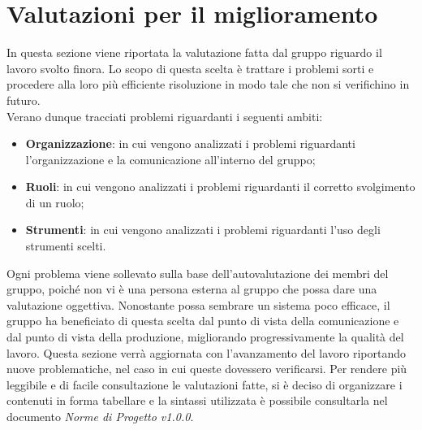 \section{Valutazioni per il miglioramento}
In questa sezione viene riportata la valutazione fatta dal gruppo riguardo il 
lavoro svolto finora. Lo scopo di questa scelta è trattare i problemi sorti e
procedere alla loro più efficiente risoluzione in modo tale che non si verifichino
in futuro. \\
Verano dunque tracciati problemi riguardanti i seguenti ambiti:

\begin{itemize}
	\item \textbf{Organizzazione}: in cui vengono analizzati i problemi riguardanti 
		l'organizzazione e la comunicazione all'interno del gruppo;
	\item \textbf{Ruoli}: in cui vengono analizzati i problemi riguardanti il 
		corretto svolgimento di un ruolo;
	\item \textbf{Strumenti}: in cui vengono analizzati i problemi riguardanti 
		l'uso degli strumenti scelti.
\end{itemize}

\noindent Ogni problema viene sollevato sulla base dell'autovalutazione dei membri del 
gruppo, poiché non vi è una persona esterna al gruppo che possa dare una valutazione
oggettiva. Nonostante possa sembrare un sistema poco efficace, il gruppo ha 
beneficiato di questa scelta dal punto di vista della comunicazione e dal punto di
vista della produzione, migliorando progressivamente la qualità del lavoro.
Questa sezione verrà aggiornata con l'avanzamento del lavoro riportando nuove 
problematiche, nel caso in cui queste dovessero verificarsi.
Per rendere più leggibile e di facile consultazione le valutazioni fatte, si è
deciso di organizzare i contenuti in forma tabellare e la sintassi utilizzata è 
possibile consultarla nel documento \textit{Norme di Progetto v1.0.0}.

